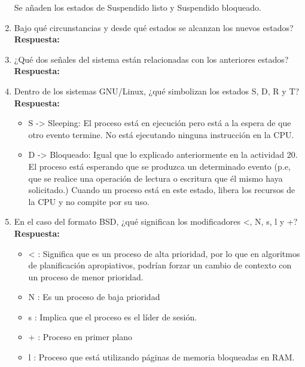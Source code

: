 \documentclass[a4paper,12pt]{article}
\begin{document}
\begin{enumerate}[label=\textbf{Pregunta \arabic*.}]
    Se añaden los estados de Suspendido listo y Suspendido bloqueado.

    \item Bajo qué circunstancias y desde qué estados se alcanzan los nuevos estados? \\ %
    \textbf{Respuesta:} 
    


    \item ¿Qué dos señales del sistema están relacionadas con los anteriores estados? \\ %
    \textbf{Respuesta:} 
    

    \item Dentro de los sistemas GNU/Linux, ¿qué simbolizan los estados S, D, R y T? \\ %
    \textbf{Respuesta:} 
    
    \begin{itemize}
        \item S -> Sleeping: El proceso está en ejecución pero está a la espera de que otro evento termine. No está ejecutando ninguna instrucción en la CPU.

        \item D -> Bloqueado: Igual que lo explicado anteriormente en la actividad 20. El proceso está esperando que se produzca un determinado evento (p.e, que se realice una operación de lectura o escritura que él mismo haya solicitado.) Cuando un proceso está en este estado, libera los recursos de la CPU y no compite por su uso.

    \end{itemize}


    \item En el caso del formato BSD, ¿qué significan los modificadores <, N, s, l y +? \\
    \textbf{Respuesta:} 
    
    \begin{itemize}
        \item < : Significa que es un proceso de alta prioridad, por lo que en algoritmos de planificación apropiativos, podrían forzar un cambio de contexto con un proceso de menor prioridad.
        \item N : Es un proceso de baja prioridad
        \item s : Implica que el proceso es el líder de sesión.
        \item + : Proceso en primer plano
        \item l : Proceso que está utilizando páginas de memoria bloqueadas en RAM.
    \end{itemize}


\end{enumerate}
\end{document}
